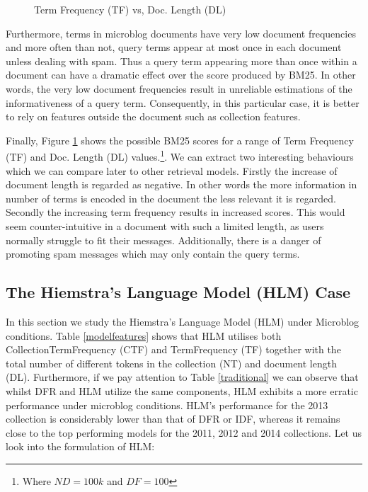 \begin{figure}[]
  \centering
   
     \caption{Term Frequency (TF) vs, Doc. Length (DL)}
  \label{bm25scoretfdl}
\end{figure}

Furthermore, terms in microblog documents have very low document frequencies and more often than not, query terms appear at most once in each document unless dealing with spam. Thus a query term appearing more than once within a document can have a dramatic effect over the score produced by BM25. In other words, the very low document frequencies result in unreliable estimations of the informativeness of a query term. Consequently, in this particular case, it is better to rely on features outside the document such as collection features.

Finally, Figure \ref{bm25scoretfdl} shows the possible BM25 scores for a range of Term Frequency (TF) and Doc. Length (DL) values.\footnote{Where \(ND=100k\) and \(DF=100\)}. We can extract two interesting behaviours which we can compare later to other retrieval models. Firstly the increase of document length is regarded as negative. In other words the more information in number of terms is encoded in the document the less relevant it is regarded. Secondly the increasing term frequency results in increased scores. This would seem counter-intuitive in a document with such a limited length, as users normally struggle to fit their messages. Additionally, there is a danger of promoting spam messages which may only contain the query terms.



\subsection{The Hiemstra's Language Model (HLM) Case}
In this section we study the Hiemstra's Language Model (HLM) \cite{hiemstra2001using} under Microblog conditions. Table \ref{modelfeatures} shows that HLM utilises both CollectionTermFrequency (CTF) and TermFrequency (TF) together with the total number of different tokens in the collection (NT) and document length (DL). Furthermore, if we pay attention to Table \ref{traditional} we can observe that whilst DFR and HLM utilize the same components, HLM exhibits a more erratic performance under microblog conditions. HLM's performance for the 2013 collection is considerably lower than that of DFR or IDF, whereas it remains close to the top performing models for the 2011, 2012 and 2014 collections. Let us look into the formulation of HLM: 

